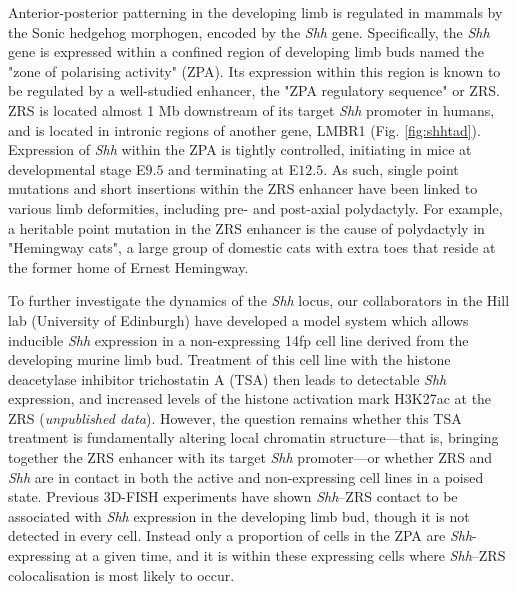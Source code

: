 \documentclass[a4paper,11pt,oneside]{book}
\begin{document}

Anterior-posterior patterning in the developing limb is regulated in mammals by the Sonic hedgehog morphogen, encoded by the \emph{Shh} gene.\cite{Anderson2012} Specifically, the \emph{Shh} gene is expressed within a confined region of developing limb buds named the "zone of polarising activity" (ZPA). Its expression within this region is known to be regulated by a well-studied enhancer, the "ZPA regulatory sequence" or ZRS.\cite{Hill2013a} ZRS is located almost 1 Mb downstream of its target \emph{Shh} promoter in humans, and is located in intronic regions of another gene, LMBR1 (Fig. \ref{fig:shhtad}).\cite{Hill2013a, Laurell2012} Expression of \emph{Shh} within the ZPA is tightly controlled, initiating in mice at developmental stage E$9.5$ and terminating at E$12.5$.\cite{Amano2009} As such, single point mutations and short insertions within the ZRS enhancer have been linked to various limb deformities, including pre- and post-axial polydactyly.\cite{Anderson2012, Lettice2008, Laurell2012} For example, a heritable point mutation in the ZRS enhancer is the cause of polydactyly in "Hemingway cats", a large group of domestic cats with extra toes that reside at the former home of Ernest Hemingway.\cite{Lettice2008, Zeller2009}  

To further investigate the dynamics of the \emph{Shh} locus, our collaborators in the Hill lab (University of Edinburgh) have developed a model system which allows inducible \emph{Shh} expression in a non-expressing 14fp cell line derived from the developing murine limb bud. Treatment of this cell line with the histone deacetylase inhibitor trichostatin A (TSA) then leads to detectable \emph{Shh} expression, and increased levels of the histone activation mark H3K27ac at the ZRS (\emph{unpublished data}). However, the question remains whether this TSA treatment is fundamentally altering local chromatin structure---that is, bringing together the ZRS enhancer with its target \emph{Shh} promoter---or whether ZRS and \emph{Shh} are in contact in both the active and non-expressing cell lines in a poised state. Previous 3D-FISH experiments have shown \emph{Shh}--ZRS contact  to be associated with \emph{Shh} expression in the developing limb bud, though it is not detected in every cell.\cite{Amano2009, Hill2013a} Instead only a proportion of cells in the ZPA are \emph{Shh}-expressing at a given time, and it is within these expressing cells where \emph{Shh}--ZRS colocalisation is most likely to occur.\cite{Amano2009}
\end{document}
